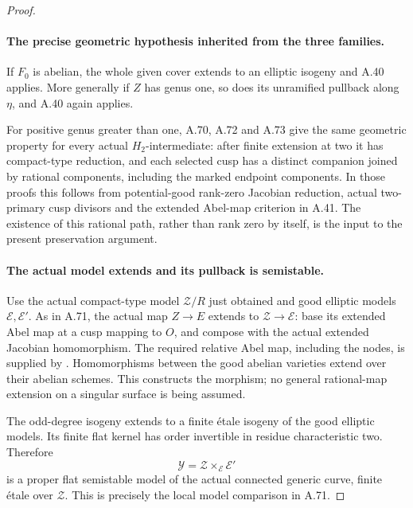 \begin{proof}
\paragraph{The precise geometric hypothesis inherited from the three families.}
If \(F_0\) is abelian, the whole given cover extends to
an elliptic isogeny and A.40 applies. More generally if
\(Z\) has genus one, so does its unramified pullback
along \(\eta\), and A.40 again applies.

For positive genus greater than one, A.70, A.72 and A.73
give the same geometric property for every actual
\(H_2\)-intermediate: after finite extension at two it
has compact-type reduction, and each selected cusp has
a distinct companion joined by rational components,
including the marked endpoint components. In those proofs
this follows from potential-good rank-zero Jacobian
reduction, actual two-primary cusp divisors and the
extended Abel-map criterion in A.41. The existence of
this rational path, rather than rank zero by itself,
is the input to the present preservation argument.

\paragraph{The actual model extends and its pullback is semistable.}
Use the actual compact-type model \(\mathcal Z/R\) just
obtained and good elliptic models \(\mathcal E,\mathcal E'\).
As in A.71, the actual map \(Z\to E\) extends to
\(\mathcal Z\to\mathcal E\): base its extended Abel map
at a cusp mapping to \(O\), and compose with the actual
extended Jacobian homomorphism. The required relative Abel
map, including the nodes, is supplied by
\cite[Theorem 1.1 and Proposition 3.2]{fghDupuyRabinoff}.
Homomorphisms between the good abelian varieties extend
over their abelian schemes. This constructs the morphism;
no general rational-map extension on a singular surface
is being assumed.

The odd-degree isogeny extends to a finite \'{e}tale
isogeny of the good elliptic models. Its finite flat
kernel has order invertible in residue characteristic two.
Therefore
\[
             \mathcal Y=\mathcal Z\times_{\mathcal E}\mathcal E'
\]
is a proper flat semistable model of the actual connected
generic curve, finite \'{e}tale over \(\mathcal Z\).
This is precisely the local model comparison in A.71.


\end{proof}
